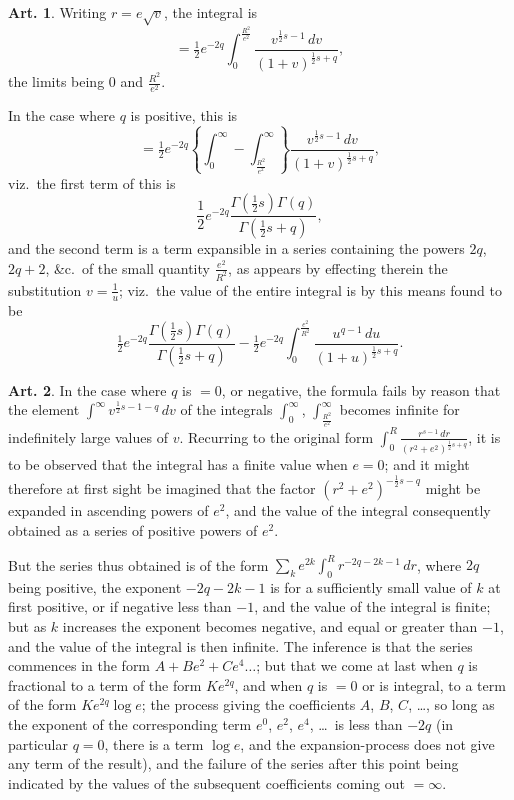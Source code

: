 \documentclass[12pt,a4paper]{article}
\theoremstyle{definition}
\newtheorem{art}{Art.}[section]
\begin{document}
\begin{art}\label{art:54}
Writing $r = e\sqrt{v}$, the integral is
\[
= \tfrac{1}{2}e^{-2q} \int_0^{\frac{R^2}{e^2}} \frac{v^{\frac{1}{2}s-1} \, dv}{(1+v)^{\frac{1}{2}s+q}},
\]
the limits being $0$ and $\frac{R^2}{e^2}$.

In the case where $q$ is positive, this is
\[
= \tfrac{1}{2}e^{-2q} \left\{ \int_0^\infty - \int_{\frac{R^2}{e^2}}^\infty \right\} \frac{v^{\frac{1}{2}s-1} \, dv}{(1+v)^{\frac{1}{2}s+q}},
\]
viz.\ the first term of this is
\[
\frac{1}{2}e^{-2q} \frac{\Gamma(\tfrac{1}{2}s)\Gamma(q)}{\Gamma(\tfrac{1}{2}s+q)},
\]
and the second term is a term expansible in a series containing the powers $2q$, $2q+2$, \&c.\ of the small quantity $\frac{e^2}{R^2}$, as appears by effecting therein the substitution $v = \frac{1}{u}$; viz.\ the value of the entire integral is by this means found to be
\[
\tfrac{1}{2}e^{-2q} \frac{\Gamma(\tfrac{1}{2}s)\Gamma(q)}{\Gamma(\tfrac{1}{2}s+q)} - \tfrac{1}{2}e^{-2q} \int_0^{\frac{e^2}{R^2}} \frac{u^{q-1} \, du}{(1+u)^{\frac{1}{2}s+q}}.
\]
\end{art}

\begin{art}\label{art:55}
In the case where $q$ is $=0$, or negative, the formula fails by reason that the element $\int^\infty v^{\frac{1}{2}s-1-q} \, dv$ of the integrals $\int_0^\infty$, $\int_{\frac{R^2}{e^2}}^\infty$ becomes infinite for indefinitely large values of $v$. Recurring to the original form $\int_0^R \frac{r^{s-1}\,dr}{(r^2+e^2)^{\frac{1}{2}s+q}}$, it is to be observed that the integral has a finite value when $e = 0$; and it might therefore at first sight be imagined that the factor $(r^2 + e^2)^{-\frac{1}{2}s-q}$ might be expanded in ascending powers of $e^2$, and the value of the integral consequently obtained as a series of positive powers of $e^2$.

But the series thus obtained is of the form $\sum_k e^{2k} \int_0^R r^{-2q-2k-1} \, dr$, where $2q$ being positive, the exponent $-2q-2k-1$ is for a sufficiently small value of $k$ at first positive, or if negative less than $-1$, and the value of the integral is finite; but as $k$ increases the exponent becomes negative, and equal or greater than $-1$, and the value of the integral is then infinite. The inference is that the series commences in the form $A + Be^2 + Ce^4 \ldots$; but that we come at last when $q$ is fractional to a term of the form $Ke^{2q}$, and when $q$ is $=0$ or is integral, to a term of the form $Ke^{2q}\log e$; the process giving the coefficients $A$, $B$, $C$, \ldots, so long as the exponent of the corresponding term $e^0$, $e^2$, $e^4$, \ldots\ is less than $-2q$ (in particular $q = 0$, there is a term $\log e$, and the expansion-process does not give any term of the result), and the failure of the series after this point being indicated by the values of the subsequent coefficients coming out $= \infty$.
\end{art}
\end{document}
